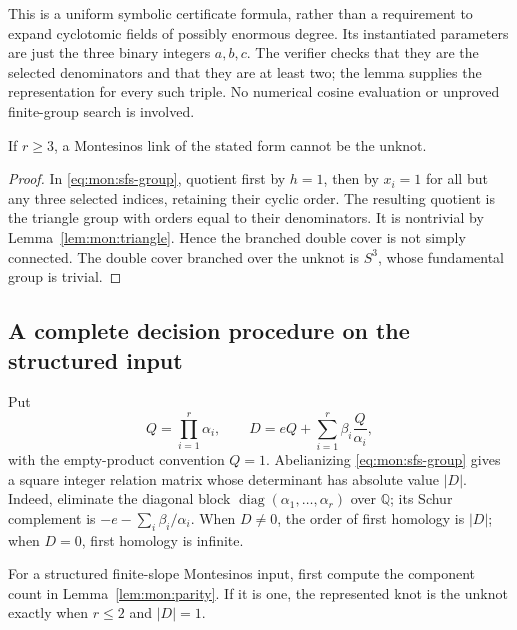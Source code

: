 This is a uniform symbolic certificate formula, rather than a requirement to
expand cyclotomic fields of possibly enormous degree.  Its instantiated
parameters are just the three binary integers $a,b,c$.  The verifier checks
that they are the selected denominators and that they are at least two; the
lemma supplies the representation for every such triple.  No numerical cosine
evaluation or unproved finite-group search is involved.

\begin{proposition}
\label{prop:mon:three}
If $r\ge3$, a Montesinos link of the stated form cannot be the unknot.
\end{proposition}

\begin{proof}
In \eqref{eq:mon:sfs-group}, quotient first by $h=1$, then by $x_i=1$ for
all but any three selected indices, retaining their cyclic order.  The resulting
quotient is the triangle group with orders equal to their denominators.
It is nontrivial by Lemma~\ref{lem:mon:triangle}.  Hence the branched double
cover is not simply connected.  The double cover branched over the unknot
is $S^3$, whose fundamental group is trivial.
\end{proof}

\subsection{A complete decision procedure on the structured input}

Put
\begin{equation}\label{eq:mon:delta}
 Q=\prod_{i=1}^r\alpha_i,\qquad
 D=eQ+\sum_{i=1}^r\beta_i\frac{Q}{\alpha_i},
\end{equation}
with the empty-product convention $Q=1$.  Abelianizing
\eqref{eq:mon:sfs-group} gives a square integer relation matrix whose
determinant has absolute value $|D|$.  Indeed, eliminate the diagonal block
$\operatorname{diag}(\alpha_1,\ldots,\alpha_r)$ over $\mathbb Q$; its Schur
complement is $-e-\sum_i\beta_i/\alpha_i$.  When $D\ne0$, the order of first
homology is $|D|$; when $D=0$, first homology is infinite.

\begin{theorem}
\label{thm:mon:complete}
For a structured finite-slope Montesinos input, first compute the component
count in Lemma~\ref{lem:mon:parity}.  If it is one, the represented knot is
the unknot exactly when $r\le2$ and $|D|=1$.
\end{theorem}

